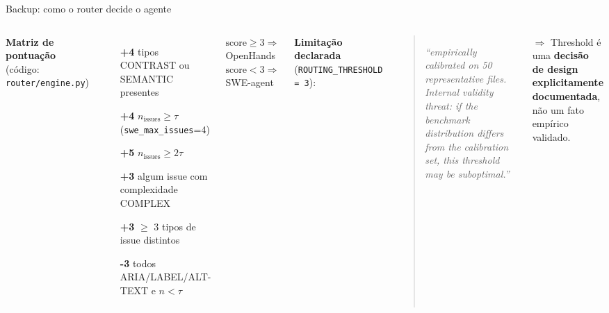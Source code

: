 \documentclass[aspectratio=169]{beamer}
\begin{document}
\begin{frame}[noframenumbering]{Backup: como o router decide o agente}
\small
\begin{columns}[T]
\textbf{Matriz de pontuação} (código: \texttt{router/engine.py})
\begin{itemize}
  \item[\textbf{+4}] tipos CONTRAST ou SEMANTIC presentes
  \item[\textbf{+4}] $n_{\text{issues}} \geq \tau$ (\texttt{swe\_max\_issues}=4)
  \item[\textbf{+5}] $n_{\text{issues}} \geq 2\tau$
  \item[\textbf{+3}] algum issue com complexidade COMPLEX
  \item[\textbf{+3}] $\geq$ 3 tipos de issue distintos
  \item[\textbf{-3}] todos ARIA/LABEL/ALT-TEXT e $n<\tau$
\end{itemize}
\vspace{0.3em}
$\text{score} \geq 3 \Rightarrow$ OpenHands \quad
$\text{score} < 3 \Rightarrow$ SWE-agent

\textbf{Limitação declarada} (\texttt{ROUTING\_THRESHOLD = 3}):
\begin{quote}\small
\textit{``empirically calibrated on 50 representative files. Internal validity threat: if the benchmark distribution differs from the calibration set, this threshold may be suboptimal.''}
\end{quote}
$\Rightarrow$ Threshold é uma \textbf{decisão de design
explicitamente documentada}, não um fato empírico validado.
\end{columns}
\end{frame}
\end{document}

